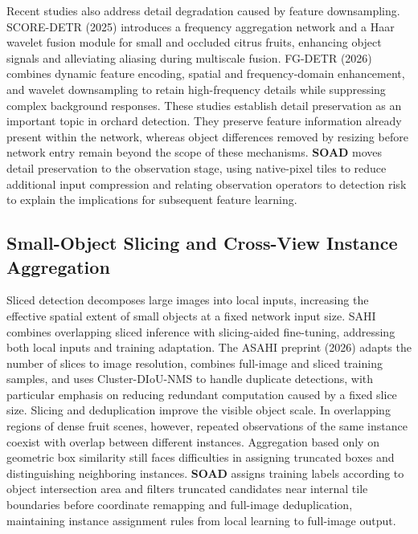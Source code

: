 \documentclass[11pt,a4paper]{article}
\begin{document}
Recent studies also address detail degradation caused by feature downsampling. SCORE-DETR (2025) \cite{scoredetr} introduces a frequency aggregation network and a Haar wavelet fusion module for small and occluded citrus fruits, enhancing object signals and alleviating aliasing during multiscale fusion. FG-DETR (2026) \cite{fgdetr} combines dynamic feature encoding, spatial and frequency-domain enhancement, and wavelet downsampling to retain high-frequency details while suppressing complex background responses. These studies establish detail preservation as an important topic in orchard detection. They preserve feature information already present within the network, whereas object differences removed by resizing before network entry remain beyond the scope of these mechanisms. \textbf{SOAD} moves detail preservation to the observation stage, using native-pixel tiles to reduce additional input compression and relating observation operators to detection risk to explain the implications for subsequent feature learning.

\subsection{Small-Object Slicing and Cross-View Instance Aggregation}
Sliced detection decomposes large images into local inputs, increasing the effective spatial extent of small objects at a fixed network input size. SAHI \cite{sahi} combines overlapping sliced inference with slicing-aided fine-tuning, addressing both local inputs and training adaptation. The ASAHI preprint (2026) \cite{asahi} adapts the number of slices to image resolution, combines full-image and sliced training samples, and uses Cluster-DIoU-NMS to handle duplicate detections, with particular emphasis on reducing redundant computation caused by a fixed slice size. Slicing and deduplication improve the visible object scale. In overlapping regions of dense fruit scenes, however, repeated observations of the same instance coexist with overlap between different instances. Aggregation based only on geometric box similarity still faces difficulties in assigning truncated boxes and distinguishing neighboring instances. \textbf{SOAD} assigns training labels according to object intersection area and filters truncated candidates near internal tile boundaries before coordinate remapping and full-image deduplication, maintaining instance assignment rules from local learning to full-image output.
\end{document}
